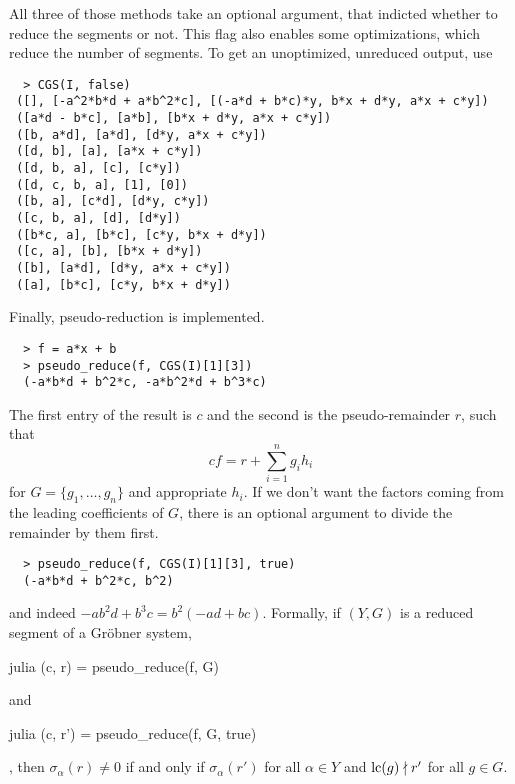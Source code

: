 All three of those methods take an optional argument, that indicted whether to reduce the segments or not. This flag also enables some optimizations, which reduce the number of segments. To get an unoptimized, unreduced output, use
\begin{verbatim}
  > CGS(I, false)
 ([], [-a^2*b*d + a*b^2*c], [(-a*d + b*c)*y, b*x + d*y, a*x + c*y])
 ([a*d - b*c], [a*b], [b*x + d*y, a*x + c*y])
 ([b, a*d], [a*d], [d*y, a*x + c*y])
 ([d, b], [a], [a*x + c*y])
 ([d, b, a], [c], [c*y])
 ([d, c, b, a], [1], [0])
 ([b, a], [c*d], [d*y, c*y])
 ([c, b, a], [d], [d*y])
 ([b*c, a], [b*c], [c*y, b*x + d*y])
 ([c, a], [b], [b*x + d*y])
 ([b], [a*d], [d*y, a*x + c*y])
 ([a], [b*c], [c*y, b*x + d*y])
\end{verbatim}

Finally, pseudo-reduction is implemented.
\begin{verbatim}
  > f = a*x + b
  > pseudo_reduce(f, CGS(I)[1][3])
  (-a*b*d + b^2*c, -a*b^2*d + b^3*c)
\end{verbatim}
The first entry of the result is $c$ and the second is the pseudo-remainder $r$, such that
\[c f = r + \sum_{i=1}^{n} g_{i} h_{i}\]
for $G = \{g_{1}, \dots, g_{n}\}$ and appropriate $h_{i}$. If we don't want the factors coming from the leading coefficients of $G$, there is an optional argument to divide the remainder by them first.
\begin{verbatim}
  > pseudo_reduce(f, CGS(I)[1][3], true)
  (-a*b*d + b^2*c, b^2)
\end{verbatim}
and indeed $-a b^2 d + b^3 c = b^{2}(-ad + bc)$. Formally, if $(Y, G)$ is a reduced segment of a Gröbner system, \begin{mintinline}{julia} (c, r) = pseudo\_reduce(f, G) \end{mintinline} and \begin{mintinline}{julia} (c, r') = pseudo\_reduce(f, G, true) \end{mintinline}, then $\sigma_{\alpha}(r) \neq 0$ if and only if $\sigma_{\alpha}(r')$ for all $\alpha \in Y$ and $\operatorname{lc}(g) \nmid r'$ for all $g \in G$.
